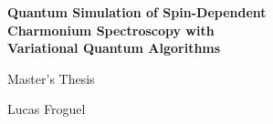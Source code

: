 \documentclass[12pt,a4paper]{report}
\theoremstyle{remark}
\begin{document}
\begin{titlepage}
\centering
\vspace*{2cm}
{\LARGE\bfseries Quantum Simulation of Spin-Dependent\\[6pt]
Charmonium Spectroscopy with\\[6pt]
Variational Quantum Algorithms\par}
\vspace{2cm}
{\Large Master's Thesis\par}
\vspace{1.5cm}
{\large Lucas Froguel\par}
\vfill
{\large\the\year\par}
\end{titlepage}

\tableofcontents
\clearpage
{}







\printbibliography[heading=bibintoc]
\end{document}
